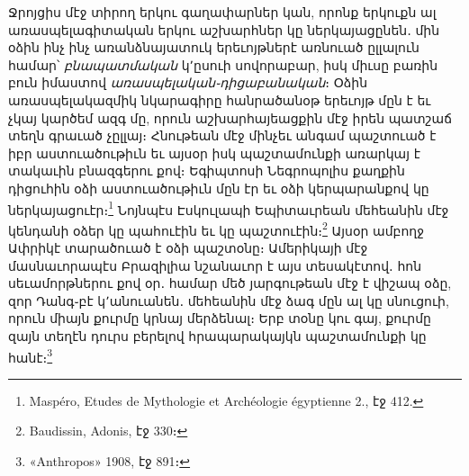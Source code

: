 \documentclass{article}
\begin{document}
{Ջրոյցիս մէջ տիրող երկու գաղափարներ կան, որոնք երկուքն ալ առասպելագիտական երկու աշխարհներ կը ներկայացընեն․ մին օձին ինչ ինչ առանձնայատուկ երեւոյթներէ առնուած ըլլալուն համար՝ \emph{բնապատմական} կ՚ըսուի սովորաբար, իսկ միւսը բառին բուն իմաստով \emph{առասպելական֊դիցաբանական}։ Օձին առասպելակազմիկ նկարագիրը հանրածանօթ երեւոյթ մըն է եւ չկայ կարծեմ ազգ մը, որուն աշխարհայեացքին մէջ իրեն պատշաճ տեղն գրաւած չըլլայ։ Հնութեան մէջ մինչեւ անգամ պաշտուած է իբր աստուածութիւն եւ այսօր իսկ պաշտամունքի առարկայ է տակաւին բնազգերու քով։ Եգիպտոսի Նեգրոպոլիս քաղքին դիցուհին օձի աստուածութիւն մըն էր եւ օձի կերպարանքով կը ներկայացուէր։\footnote{Maspéro, Etudes de Mythologie et Archéologie égyptienne 2., էջ 412.} Նոյնպէս Էսկուլապի Եպիտաւրեան մեհեանին մէջ կենդանի օձեր կը պահուէին եւ կը պաշտուէին։\footnote{Baudissin, Adonis, էջ 330։} Այսօր ամբողջ Ափրիկէ տարածուած է օձի պաշտօնը։ Ամերիկայի մէջ մասնաւորապէս Բրազիլիա նշանաւոր է այս տեսակէտով․ հոն սեւամորթներու քով օր․ համար մեծ յարգութեան մէջ է վիշապ օձը, զոր Դանգ֊բէ կ՚անուանեն․ մեհեանին մէջ ձագ մըն ալ կը սնուցուի, որուն միայն քուրմը կրնայ մերձենալ։ Երբ տօնը կու գայ, քուրմը զայն տեղէն դուրս բերելով հրապարակայկն պաշտամունքի կը հանէ։\footnote{«Anthropos» 1908, էջ 891։}

}
\end{document}
